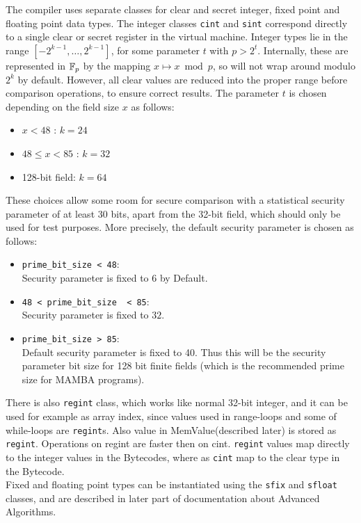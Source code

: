 The compiler uses separate classes for clear and secret integer, fixed point
and floating point data types. The integer classes \verb|cint| and \verb|sint|
correspond directly to a single clear or secret register in the virtual machine.
Integer types lie in the range $[-2^{k-1}, \dots, 2^{k-1}]$, for some
parameter $t$ with $p > 2^t$. Internally, these are represented in ${\mathbb{F}}_p$ by the
mapping $x \mapsto x \bmod{p}$, so will not wrap around modulo $2^k$ by default.
However, all clear values are reduced into the proper
range before comparison operations, to ensure correct results.
The parameter $t$ is chosen depending on the field size $x$ as follows:
\begin{itemize}
\item $x < 48$ : $k = 24$
\item $48 \le x < 85$ : $k = 32$
\item 128-bit field: $k = 64$
\end{itemize}
These choices allow some room for secure comparison with a statistical
security parameter of at least 30 bits, apart from the 32-bit field, which
should only be used for test purposes. More precisely, the default security parameter is chosen as follows:
\begin{itemize}
\item \verb|prime_bit_size < 48|:\\ 
Security parameter is fixed to $6$ by Default.
\item \verb|48 < prime_bit_size  < 85|: \\
Security parameter is fixed to $32$. 
\item \verb|prime_bit_size > 85|:\\
Default security parameter is fixed to 40. Thus this will be the security parameter bit size for 128 bit finite
fields (which is the recommended prime size for MAMBA programs).
\end{itemize} 
There is also \verb|regint| class, which works like normal 32-bit integer, and it can be used for example as array index, since values used in range-loops and some of while-loops are \verb|regint|s. Also value in MemValue(described later) is stored as \verb|regint|. Operations on regint are faster then on cint.
\verb+regint+ values map directly to the integer values in the Bytecodes,
where as \verb+cint+ map to the clear type in the Bytecode.
 \\

Fixed and floating point types can be instantiated using the \verb|sfix| and \verb|sfloat| classes, and are described in later part of documentation about Advanced Algorithms.

